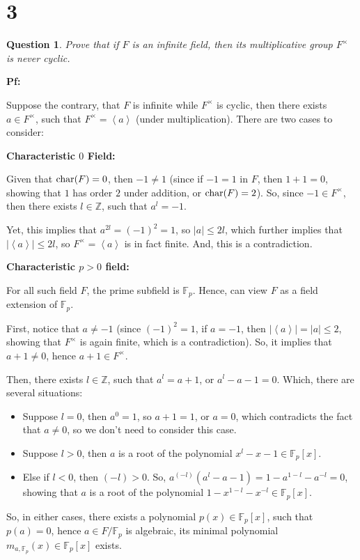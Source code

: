\documentclass{article}
\newtheorem{question}{Question}
\begin{document}
\break

\section*{3}
\begin{myBox}[]{}
    \begin{question}
        Prove that if $F$ is an infinite field, then its multiplicative group $F^\times$ is never cyclic.
    \end{question}
\end{myBox}

\textbf{Pf:}

Suppose the contrary, that $F$ is infinite while $F^\times$ is cyclic, then there exists $a\in F^\times$, such that $F^\times = \left<a\right>$ (under multiplication). There are two cases to consider:

\hfil

\textbf{Characteristic $0$ Field:}

Given that $\textmd{char}(F)=0$, then $-1 \neq 1$ (since if $-1=1$ in $F$, then $1+1=0$, showing that $1$ has order $2$ under addition, or $\textmd{char}(F)=2$). So, since $-1\in F^\times$, then there exists $l\in\mathbb{Z}$, such that $a^l = -1$.

Yet, this implies that $a^{2l} = (-1)^2 = 1$, so $|a|\leq 2l$, which further implies that $|\left<a\right>| \leq 2l$, so $F^\times=\left<a\right>$ is in fact finite. And, this is a contradiction.

\hfil

\textbf{Characteristic $p>0$ field:}

For all such field $F$, the prime subfield is $\mathbb{F}_p$. Hence, can view $F$ as a field extension of $\mathbb{F}_p$.

First, notice that $a\neq -1$ (since $(-1)^2=1$, if $a=-1$, then $|\left<a\right>| = |a|\leq 2$, showing that $F^\times$ is again finite, which is a contradiction). So, it implies that $a+1\neq 0$, hence $a+1\in F^\times$.

Then, there exists $l\in\mathbb{Z}$, such that $a^l = a+1$, or $a^l-a-1 =0$. Which, there are several situations:
\begin{itemize}
    \item Suppose $l=0$, then $a^0 = 1$, so $a+1 = 1$, or $a=0$, which contradicts the fact that $a\neq 0$, so we don't need to consider this case.
    \item Suppose $l>0$, then $a$ is a root of the polynomial $x^l-x-1 \in \mathbb{F}_p[x]$.
    \item Else if $l<0$, then $(-l)>0$. So, $a^{(-l)}(a^l-a-1) = 1-a^{1-l}-a^{-l} = 0$, showing that $a$ is a root of the polynomial $1-x^{1-l}-x^{-l}\in\mathbb{F}_p[x]$.
\end{itemize}
So, in either cases, there exists a polynomial $p(x)\in \mathbb{F}_p[x]$, such that $p(a)=0$, hence $a\in F/\mathbb{F}_p$ is algebraic, its minimal polynomial $m_{a,\mathbb{F}_p}(x)\in\mathbb{F}_p[x]$ exists.
\end{document}
